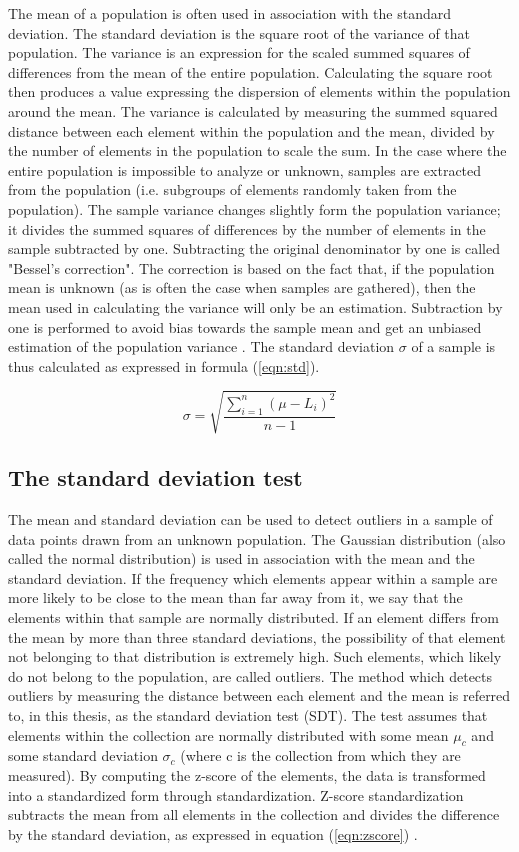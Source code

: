 The mean of a population is often used in association with the standard deviation. The standard deviation is the square root of the variance of that population. The variance is an expression for the scaled summed squares of differences from the mean of the entire population. Calculating the square root then produces a value expressing the dispersion of elements within the population around the mean. The variance is calculated by measuring the summed squared distance between each element within the population and the mean, divided by the number of elements in the population to scale the sum. In the case where the entire population is impossible to analyze or unknown, samples are extracted from the population (i.e. subgroups of elements randomly taken from the population). The sample variance changes slightly form the population variance; it divides the summed squares of differences by the number of elements in the sample subtracted by one. Subtracting the original denominator by one is called "Bessel's correction". The correction is based on the fact that, if the population mean is unknown (as is often the case when samples are gathered), then the mean used in calculating the variance will only be an estimation. Subtraction by one is performed to avoid bias towards the sample mean and get an unbiased estimation of the population variance \cite{so2008sample, nobach2020practical}. The standard deviation $\sigma$ of a sample is thus calculated as expressed in formula (\ref{eqn:std}).

\begin{equation}
\label{eqn:std}
 \sigma = \sqrt{\frac{\sum_{i = 1}^{n} (\mu - L_i)^2}{n-1}}
\end{equation}


\subsection{The standard deviation test}
The mean and standard deviation can be used to detect outliers in a sample of data points drawn from an unknown population. The Gaussian distribution (also called the normal distribution) is used in association with the mean and the standard deviation. If the frequency which elements appear within a sample are more likely to be close to the mean than far away from it, we say that the elements within that sample are normally distributed. If an element differs from the mean by more than three standard deviations, the possibility of that element not belonging to that distribution is extremely high. Such elements, which likely do not belong to the population, are called outliers. The method which detects outliers by measuring the distance between each element and the mean is referred to, in this thesis, as the standard deviation test (SDT). The test assumes that elements within the collection are normally distributed with some mean $\mu_c$ and some standard deviation $\sigma_c$ (where c is the collection from which they are measured). By computing the z-score of the elements, the data is transformed into a standardized form through standardization. Z-score standardization subtracts the mean from all elements in the collection and divides the difference by the standard deviation, as expressed in equation (\ref{eqn:zscore}) \cite{geary1935ratio}.

